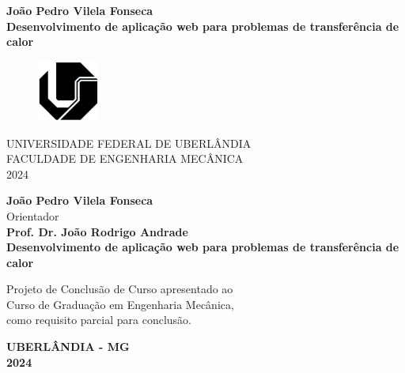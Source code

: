 \documentclass[12pt,a4paper]{article}
\begin{document}
\begin{titlepage}
    \begin{center}
        \textbf{João Pedro Vilela Fonseca\\}
        \vspace*{\fill}
        \textbf{\Large Desenvolvimento de aplicação web para problemas de transferência de calor\\}
        \vspace*{\fill}
        \begin{figure}[h]
            \center
            \includegraphics[width=2cm]{Ufu.jpg}
        \end{figure}
        UNIVERSIDADE FEDERAL DE UBERLÂNDIA\\
        \vspace{0.3cm}
        FACULDADE DE ENGENHARIA MECÂNICA\\
        \vspace{0.3cm}
        2024
    \end{center}
\end{titlepage}

\begin{titlepage}
    \begin{center}
        \textbf{\large João Pedro Vilela Fonseca\\}
        \vspace*{\fill}
        Orientador\\
        \textbf{\large Prof. Dr. João Rodrigo Andrade\\}
        \vspace*{\fill}
        \textbf{\Large Desenvolvimento de aplicação web para problemas de transferência de calor\\}
        \vspace*{\fill}
        \begin{adjustwidth}{7cm}{0cm}
            Projeto de Conclusão de Curso apresentado ao\\Curso de Graduação em Engenharia Mecânica,\\como requisito parcial para conclusão.
        \end{adjustwidth}
        \vspace*{\fill}
        \textbf{UBERLÂNDIA - MG\\}
        \textbf{2024}
    \end{center}
\end{titlepage}
\end{document}
